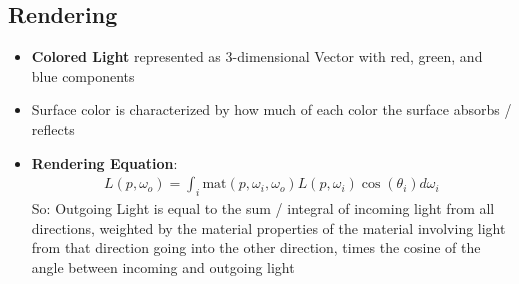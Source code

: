 \documentclass{scrartcl}
\begin{document}
\subsection*{Rendering}
\begin{itemize}
    \item \textbf{Colored Light} represented as $3$-dimensional Vector with red, green, and blue components
    \item Surface color is characterized by how much of each color the surface absorbs / reflects
    \item \textbf{Rendering Equation}:
    \begin{align*}
        L(p, \omega_o) = \int_{i} \text{mat}(p, \omega_i, \omega_o)L(p, \omega_i)\cos(\theta_i)d\omega_i
    \end{align*}
    So: Outgoing Light is equal to the sum / integral of incoming light from all directions, weighted by the material properties of the material involving light from that direction going into the other direction, times the cosine of the angle between incoming and outgoing light
\end{itemize}
\end{document}
